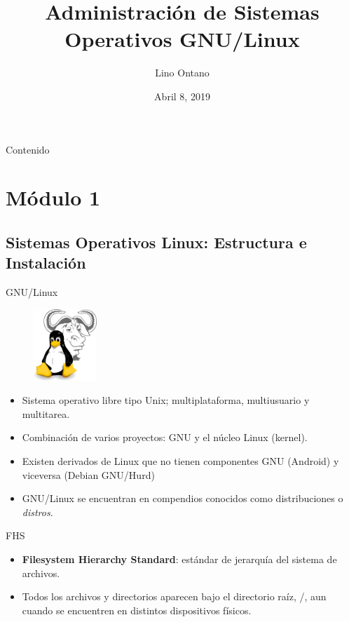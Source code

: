 \documentclass{beamer}
\title[Administración GNU/Linux]{Administración de Sistemas Operativos GNU/Linux}
\author{Lino Ontano}
\date{Abril 8, 2019}
\begin{document}
\begin{frame}
  \titlepage
\end{frame}

\begin{frame}{Contenido}
  \tableofcontents
\end{frame}

\section{Módulo 1}
\subsection{Sistemas Operativos Linux: Estructura e Instalación}
\begin{frame}{GNU/Linux}
\begin{figure}
	\includegraphics[height=2.7cm]{img/Gnulinux.png}
\end{figure}
\begin{itemize}
\item Sistema operativo libre tipo Unix; multiplataforma, multiusuario y multitarea.
\item Combinación de varios proyectos: GNU y el núcleo Linux (kernel).
\item Existen derivados de Linux que no tienen componentes GNU (Android) y viceversa (Debian GNU/Hurd)
\item GNU/Linux se encuentran en compendios conocidos como distribuciones o \textit{distros}.
\end{itemize}
\end{frame}
\begin{frame}{FHS}
\begin{itemize}
    \item \textbf{Filesystem Hierarchy Standard}: estándar de jerarquía del sistema de archivos.
    \item Todos los archivos y directorios aparecen bajo el directorio raíz, /, aun cuando se encuentren en distintos dispositivos físicos.
\end{itemize}

\end{frame}
\end{document}
